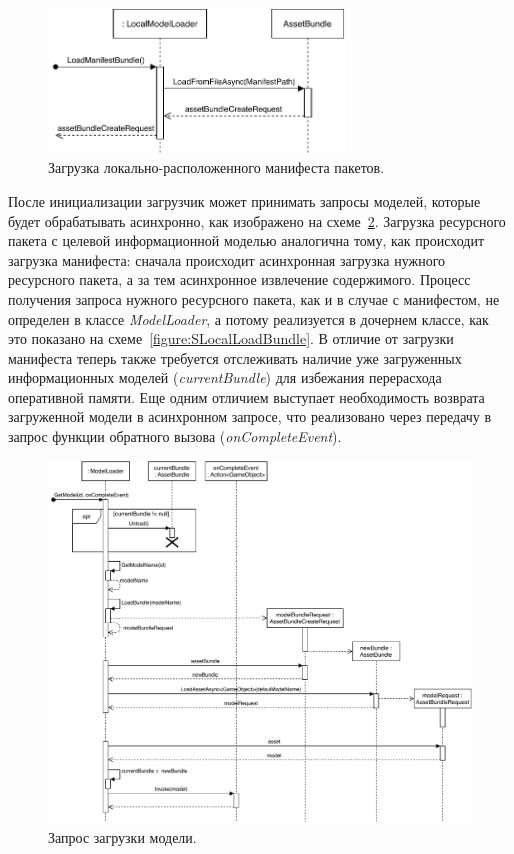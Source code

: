 \begin{figure}[!htp]
    \centering
    \includegraphics[width=0.7\textwidth]{images/UML-SLocalLoadManifestBundle.pdf}
    \caption{Загрузка локально-расположенного манифеста пакетов.}
    \label{figure:SLocalLoadManifestBundle}
\end{figure}

После инициализации загрузчик может принимать запросы моделей,
которые будет обрабатывать асинхронно, как изображено
на схеме~\ref{figure:SModelRequest}.
Загрузка ресурсного пакета с целевой информационной моделью аналогична тому,
как происходит загрузка манифеста: сначала происходит
асинхронная загрузка нужного ресурсного пакета,
а за тем асинхронное извлечение содержимого.
Процесс получения запроса нужного ресурсного пакета,
как и в случае с манифестом, не определен в классе \emph{ModelLoader},
а потому реализуется в дочернем классе,
как это показано на схеме~\ref{figure:SLocalLoadBundle}.
В отличие от загрузки манифеста теперь также требуется
отслеживать наличие уже загруженных информационных моделей (\emph{currentBundle})
для избежания перерасхода оперативной памяти.
Еще одним отличием выступает необходимость возврата загруженной модели
в асинхронном запросе, что реализовано через передачу в запрос
функции обратного вызова (\emph{onCompleteEvent}).

\begin{figure}[!htp]
    \centering
    \includegraphics[width=1.0\textwidth]{images/UML-SModelRequest.pdf}
    \caption{Запрос загрузки модели.}
    \label{figure:SModelRequest}
\end{figure}


